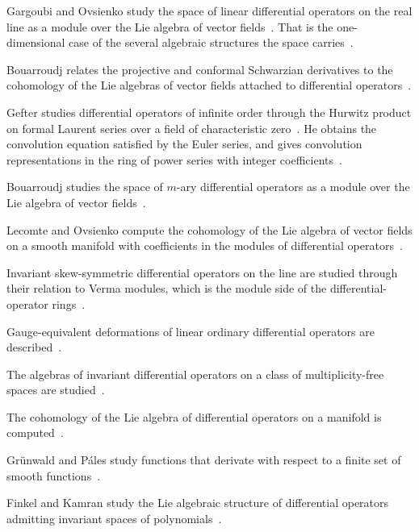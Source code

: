 Gargoubi and Ovsienko study the space of linear differential operators on the
real line as a module over the Lie algebra of vector fields~\cite{WlSpaceOfLinearDifferentialOpera1996}. That is the
one-dimensional case of the several algebraic structures the space
carries~\cite{WlSpaceOfLinearDifferentialOpera1996}.

Bouarroudj relates the projective and conformal Schwarzian derivatives to the
cohomology of the Lie algebras of vector fields attached to differential
operators~\cite{WlProjectiveAndConformalSchwarzi2006}.

Gefter studies differential operators of infinite order through the Hurwitz
product on formal Laurent series over a field of characteristic zero~\cite{WlDifferentialOperatorsOfInfinit2020}. He
obtains
the convolution equation satisfied by the Euler series, and gives convolution
representations in the ring of power series with integer
coefficients~\cite{WlDifferentialOperatorsOfInfinit2020}.

Bouarroudj studies the space of $m$-ary differential operators as a module
over the Lie algebra of vector
fields~\cite{WlTheSpaceOfMAryDifferentialOper2020}.

Lecomte and Ovsienko compute the cohomology of the Lie algebra of vector
fields on a smooth manifold with coefficients in the modules of differential
operators~\cite{WlCohomologyOfTheVectorFieldsLie2020}.

Invariant skew-symmetric differential operators on the line are studied
through their relation to Verma modules, which is the module side of the
differential-operator rings~\cite{WlInvariantSkewSymmetricDifferen2020}.

Gauge-equivalent deformations of linear ordinary differential operators are
described~\cite{WlGaugeEquivalentDeformationsOfL2020}.

The algebras of invariant differential operators on a class of
multiplicity-free spaces are
studied~\cite{WlAlgebrasOfInvariantDifferentia2020}.

The cohomology of the Lie algebra of differential operators on a manifold is
computed~\cite{WlCohomologyOfTheLieAlgebraOfDif2020}.

Gr\"unwald and P\'ales study functions that derivate with respect to a finite
set of smooth functions~\cite{WlOnDerivationsWithRespectToFini2020}.

Finkel and Kamran study the Lie algebraic structure of differential operators
admitting invariant spaces of
polynomials~\cite{WlTheLieAlgebraicStructureOfDiff2020}.

